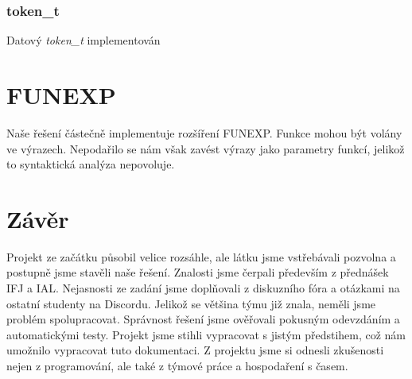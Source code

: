 \documentclass[a4paper, 12pt]{article}
\begin{document}
\subsubsection{token\_t}
Datový \textit{token\_t} implementován

\newpage
{}
\section{FUNEXP}
Naše řešení částečně implementuje rozšíření FUNEXP.\newline
Funkce mohou být volány ve výrazech. Nepodařilo se nám však zavést výrazy jako parametry funkcí, jelikož to syntaktická analýza nepovoluje.

\section{Závěr}
Projekt ze začátku působil velice rozsáhle, ale látku jsme vstřebávali pozvolna a postupně jsme stavěli naše řešení. Znalosti jsme čerpali především z přednášek IFJ a IAL. Nejasnosti ze zadání jsme doplňovali z diskuzního fóra a otázkami na ostatní studenty na Discordu. Jelikož se většina týmu již znala, neměli jsme problém spolupracovat. Správnost řešení jsme ověřovali pokusným odevzdáním a automatickými testy. Projekt jsme stihli vypracovat s jistým předstihem, což nám umožnilo vypracovat tuto dokumentaci. Z projektu jsme si odnesli zkušenosti nejen z programování, ale také z týmové práce a hospodaření s časem.

\newpage
{}


\end{document}
